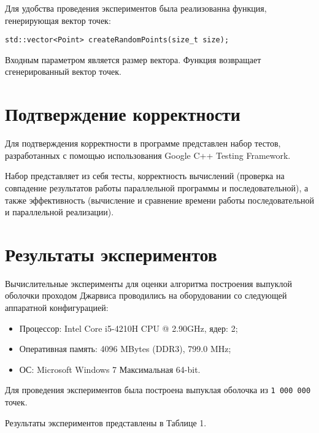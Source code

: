 \documentclass{report}
\begin{document}
\par Для удобства проведения экспериментов была реализованна функция, генерирующая вектор точек:
\begin{lstlisting}
std::vector<Point> createRandomPoints(size_t size);
\end{lstlisting}
\par Входным параметром является размер вектора. Функция возвращает сгенерированный вектор точек.
\newpage

\section*{Подтверждение корректности}
Для подтверждения корректности в программе представлен набор тестов, разработанных с помощью использования Google C++ Testing Framework.
\par Набор представляет из себя тесты, корректность вычислений (проверка на совпадение результатов работы параллельной программы и последовательной), а также эффективность (вычисление и сравнение времени работы последовательной и параллельной реализации).
\newpage

\section*{Результаты экспериментов}
Вычислительные эксперименты для оценки алгоритма построения выпуклой оболочки проходом Джарвиса проводились на оборудовании со следующей аппаратной конфигурацией:

\begin{itemize}
\item Процессор: Intel Core i5-4210H CPU @ 2.90GHz, ядер: 2;
\item Оперативная память: 4096 MBytes (DDR3), 799.0 MHz;
\item ОС: Microsoft Windows 7 Максимальная 64-bit.
\end{itemize}

\par Для проведения экспериментов была построена выпуклая оболочка из \verb|1 000 000| точек. 
\par Результаты экспериментов представлены в Таблице 1.
\end{document}
